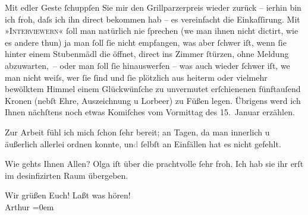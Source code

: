 \pstart
           Mit edler Geste ſchuppſen Sie mir den Grillparzerpreis wieder zurück – i{\geminationm}erhin bin
               ich froh, daſs ich ihn direct bekommen hab – es vereinfacht die Einkaſſirung. Mit
                  »\textsc{Interviewern}« ſoll man natürlich nie ſprechen (we{\geminationn} man ihnen
               nicht dictirt, wie es andere thun) {\pb}ja man ſoll ſie nicht
               empfangen, was aber ſchwer iſt, wenn ſie hinter einem Stubenmädl die öffnet, direct
               ins Zimmer ſtürzen, ohne Meldung abzuwarten, – oder man ſoll ſie hinauswerfen – was
               auch wieder ſchwer iſt, we{\geminationn} man nicht weiſs, wer ſie
               ſind und ſie plötzlich aus heiterm oder vielmehr bewölktem Himmel einem Glückwünſche
               zu unvermutet erſchienenen fünftauſend Kronen (nebſt Ehre, Auszeichnung u Lorbeer) zu
               Füßen legen. Übrigens werd ich Ihnen {\pb}nächſtens noch
               etwas Komiſches vom Vormittag des 15. Januar erzählen.\pend
           
\pstart
           Zur Arbeit fühl ich mich ſchon ſehr bereit; an Tagen, da man innerlich u äußerlich
               allerlei ordnen konnte, un\textcolor{gray}{d} ſelbſt an Einfällen hat es  nicht gefehlt.\pend
           
\pstart
           Wie gehts Ihnen Allen? Olga iſt über die
               prachtvolle \label{K_L01758-3v}\label{K_L01758-3} ſehr froh. Ich hab sie \introOben{}ihr\introOben{}
               erſt im desinfizirten Raum übergeben.\pend
           
\pstart
           Wir grüßen Euch! Laßt was hören!{\\[\baselineskip]}\spacefill\mbox{Arthur}\pend
           \leftskip=0em{}\endnumbering{}  
      